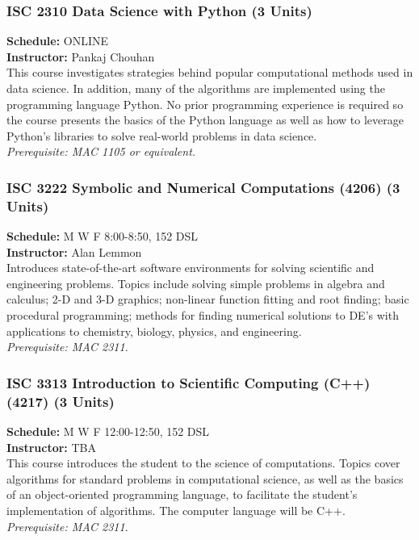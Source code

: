 \documentclass[12pt,a4paper]{article}
\begin{document}
\subsubsection*{ISC 2310 Data Science with Python (3 Units)}
\textbf{Schedule:} ONLINE \\
\textbf{Instructor:} Pankaj Chouhan \\
This course investigates strategies behind popular computational methods used in data science. In addition, many of the algorithms are implemented using the programming language Python. No prior programming experience is required so the course presents the basics of the Python language as well as how to leverage Python’s libraries to solve real-world problems in data science. \\
\textit{Prerequisite: MAC 1105 or equivalent.}

\subsubsection*{ISC 3222 Symbolic and Numerical Computations (4206) (3 Units)}
\textbf{Schedule:} M W F 8:00-8:50, 152 DSL \\
\textbf{Instructor:} Alan Lemmon \\
Introduces state-of-the-art software environments for solving scientific and engineering problems. Topics include solving simple problems in algebra and calculus; 2-D and 3-D graphics; non-linear function fitting and root finding; basic procedural programming; methods for finding numerical solutions to DE's with applications to chemistry, biology, physics, and engineering. \\
\textit{Prerequisite: MAC 2311.}

\subsubsection*{ISC 3313 Introduction to Scientific Computing (C++) (4217) (3 Units)}
\textbf{Schedule:} M W F 12:00-12:50, 152 DSL \\
\textbf{Instructor:} TBA \\
This course introduces the student to the science of computations. Topics cover algorithms for standard problems in computational science, as well as the basics of an object-oriented programming language, to facilitate the student’s implementation of algorithms. The computer language will be C++. \\
\textit{Prerequisite: MAC 2311.}
\end{document}
